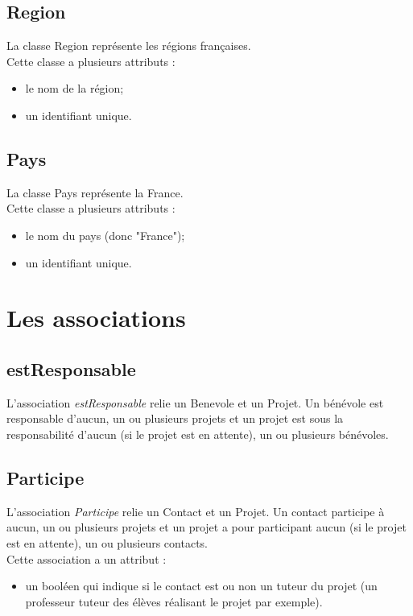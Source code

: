 \documentclass[asi, sansVersion]{picInsa}
\begin{document}
\subsection*{Region}

La classe Region représente les régions françaises.\\
Cette classe a plusieurs attributs :
\begin{itemize}
\item le nom de la région;
\item un identifiant unique.
\end{itemize}

\subsection*{Pays}

La classe Pays représente la France.\\
Cette classe a plusieurs attributs :
\begin{itemize}
\item le nom du pays (donc "France");
\item un identifiant unique.
\end{itemize}


\section{Les associations}

\subsection*{estResponsable}
L'association \textit{estResponsable} relie un Benevole et un Projet. Un bénévole est responsable d'aucun, un ou plusieurs projets et un projet est sous la responsabilité d'aucun (si le projet est en attente), un ou plusieurs bénévoles.

\subsection*{Participe}
L'association \textit{Participe} relie un Contact et un Projet. Un contact participe à aucun, un ou plusieurs projets et un projet a pour participant aucun (si le projet est en attente), un ou plusieurs contacts.\\
Cette association a un attribut :
\begin{itemize}
\item un booléen qui indique si le contact est ou non un tuteur du projet (un professeur tuteur des élèves réalisant le projet par exemple). 
\end{itemize}
\end{document}
